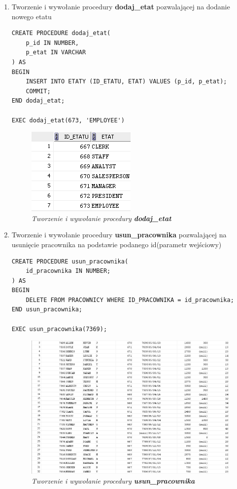 \documentclass{article}
\begin{document}
\begin{enumerate}
\item Tworzenie i wywołanie procedury \textbf{dodaj\_etat} pozwalającej na dodanie nowego etatu

\begin{lstlisting}[style=SQL, caption=\textit{Tworzenie i wywołanie procedury \textbf{dodaj\_etat}}]
CREATE PROCEDURE dodaj_etat(
	p_id IN NUMBER,
	p_etat IN VARCHAR
) AS
BEGIN
	INSERT INTO ETATY (ID_ETATU, ETAT) VALUES (p_id, p_etat);
	COMMIT;
END dodaj_etat;

EXEC dodaj_etat(673, 'EMPLOYEE')
\end{lstlisting}

		\begin{figure}[H]
			\centering
			\includegraphics[scale=1.2]{zadanie1.png}
			\caption{\textit{Tworzenie i wywołanie procedury \textbf{dodaj\_etat}}}
		\end{figure}

\item Tworzenie i wywołanie procedury \textbf{usun\_pracownika} pozwalającej na usunięcie pracownika na podstawie podanego id(parametr wejściowy)

\begin{lstlisting}[style=SQL, caption=\textit{Tworzenie i wywołanie procedury \textbf{usun\_pracownika}}]
CREATE PROCEDURE usun_pracownika(
	id_pracownika IN NUMBER;
) AS
BEGIN
	DELETE FROM PRACOWNICY WHERE ID_PRACOWNIKA = id_pracownika;
END usun_pracownika;

EXEC usun_pracownika(7369);
\end{lstlisting}

		\begin{figure}[H]
			\centering
			\includegraphics{zadanie2.png}
			\caption{\textit{Tworzenie i wywołanie procedury \textbf{usun\_pracownika}}}
		\end{figure}


\end{enumerate}
\end{document}
